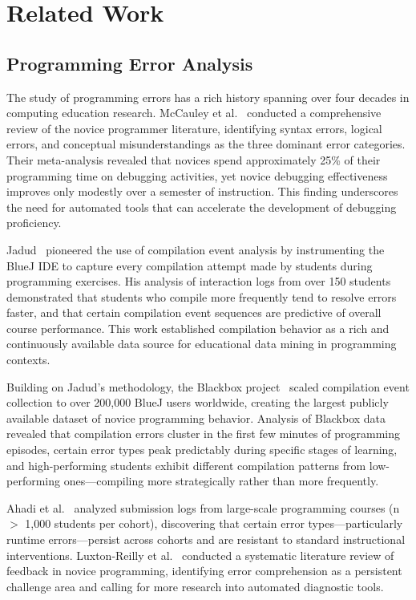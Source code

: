 \documentclass[acmsmall]{acmart}
\begin{document}
\section{Related Work}

\subsection{Programming Error Analysis}

The study of programming errors has a rich history spanning over four decades
in computing education research. McCauley et
al.~\cite{mccauley2008evidence}
conducted a comprehensive review of the novice programmer literature, identifying
syntax errors, logical errors, and conceptual misunderstandings as the three
dominant error categories. Their meta-analysis revealed that novices spend
approximately 25\% of their programming time on debugging activities, yet
novice debugging effectiveness improves only modestly over a semester of
instruction. This finding underscores the need for automated tools that can
accelerate the development of debugging proficiency.

Jadud~\cite{jadud2006methods} pioneered the use of compilation event analysis
by instrumenting the BlueJ IDE to capture every compilation attempt made by
students during programming exercises. His analysis of interaction logs from
over 150 students demonstrated that students who compile more frequently tend
to resolve errors faster, and that certain compilation event sequences are
predictive of overall course performance. This work established compilation
behavior as a rich and continuously available data source for educational data
mining in programming contexts.

Building on Jadud's methodology, the Blackbox
project~\cite{brown2014blackbox}
scaled compilation event collection to over 200,000 BlueJ users worldwide,
creating the largest publicly available dataset of novice programming behavior.
Analysis of Blackbox data revealed that compilation errors cluster in the
first few minutes of programming episodes, certain error types peak
predictably during specific stages of learning, and high-performing students
exhibit different compilation patterns from low-performing ones---compiling
more strategically rather than more frequently.

Ahadi et al.~\cite{ahadi2015exploring} analyzed submission logs from
large-scale programming courses (n $>$ 1,000 students per cohort), discovering
that certain error types---particularly runtime errors---persist across cohorts
and are resistant to standard instructional interventions. Luxton-Reilly
et al.~\cite{barbosa2023feedback} conducted a systematic literature review
of feedback in novice programming, identifying error comprehension as a
persistent challenge area and calling for more
research into automated diagnostic tools.
\end{document}
